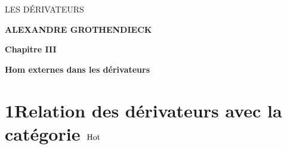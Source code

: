 \dgrchunkbegin

\printedpage{--}

\begin{center}
{\LARGE\sffamily LES DÉRIVATEURS}

\bigskip

\textbf{ALEXANDRE GROTHENDIECK}

\bigskip\bigskip

\textbf{Chapitre III}

\medskip

\textbf{Hom externes dans les dérivateurs}
\end{center}

\clearpage

\printedpage{--}


\clearpage



\section*{1\quad Relation des dérivateurs avec la catégorie $\mathrm{Hot}$}


